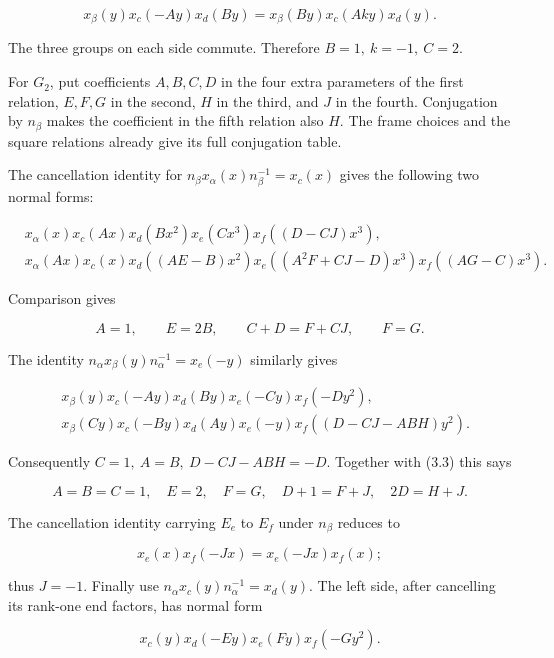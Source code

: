 \documentclass[11pt,a4paper,openany]{report}
\begin{document}
\[
x_\beta(y)x_c(-Ay)x_d(By)
=x_\beta(By)x_c(Aky)x_d(y).
\]

The three groups on each side commute. Therefore \(B=1,\ k=-1,\ C=2\).

For \(G_2\), put coefficients \(A,B,C,D\) in the four extra parameters of the first relation, \(E,F,G\) in the second, \(H\) in the third, and \(J\) in the fourth. Conjugation by \(n_\beta\) makes the coefficient in the fifth relation also \(H\). The frame choices and the square relations already give its full conjugation table.

The cancellation identity for \(n_\beta x_\alpha(x)n_\beta^{-1}=x_c(x)\) gives the following two normal forms:

\[
\begin{aligned}
&x_\alpha(x)x_c(Ax)x_d(Bx^2)x_e(Cx^3)x_f((D-CJ)x^3),\\
&x_\alpha(Ax)x_c(x)x_d((AE-B)x^2)
 x_e((A^2F+CJ-D)x^3)x_f((AG-C)x^3).
\end{aligned}
\]

Comparison gives

\[
A=1,\qquad E=2B,\qquad C+D=F+CJ,\qquad F=G.
\tag{3.3}
\]

The identity \(n_\alpha x_\beta(y)n_\alpha^{-1}=x_e(-y)\) similarly gives

\[
\begin{aligned}
&x_\beta(y)x_c(-Ay)x_d(By)x_e(-Cy)x_f(-Dy^2),\\
&x_\beta(Cy)x_c(-By)x_d(Ay)x_e(-y)x_f((D-CJ-ABH)y^2).
\end{aligned}
\]

Consequently \(C=1,\ A=B,\ D-CJ-ABH=-D\). Together with (3.3) this says

\[
A=B=C=1,\quad E=2,\quad F=G,\quad D+1=F+J,\quad 2D=H+J.
\tag{3.4}
\]

The cancellation identity carrying \(E_e\) to \(E_f\) under \(n_\beta\) reduces to

\[
x_e(x)x_f(-Jx)=x_e(-Jx)x_f(x);
\]

thus \(J=-1\). Finally use \(n_\alpha x_c(y)n_\alpha^{-1}=x_d(y)\). The left side, after cancelling its rank-one end factors, has normal form

\[
x_c(y)x_d(-Ey)x_e(Fy)x_f(-Gy^2).
\]
\end{document}
